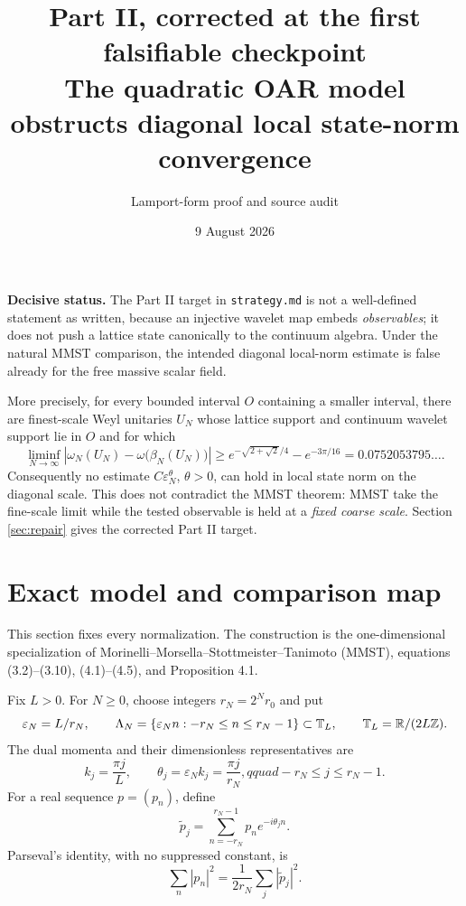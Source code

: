 \documentclass[11pt,a4paper]{article}
\title{Part II, corrected at the first falsifiable checkpoint\\[3pt]
\large The quadratic OAR model obstructs diagonal local state-norm convergence}
\author{Lamport-form proof and source audit}
\date{9 August 2026}
\newcommand{\T}{\mathbb T}
\newcommand{\eps}{\varepsilon}
\begin{document}
\maketitle

\begin{resultbox}
\textbf{Decisive status.}  The Part II target in \texttt{strategy.md} is not a
well-defined statement as written, because an injective wavelet map embeds
\emph{observables}; it does not push a lattice state canonically to the continuum
algebra.  Under the natural MMST comparison, the intended diagonal local-norm
estimate is false already for the free massive scalar field.

More precisely, for every bounded interval $O$ containing a smaller interval, there
are finest-scale Weyl unitaries $U_N$ whose lattice support and continuum wavelet
support lie in $O$ and for which
\[
 \liminf_{N\to\infty}
 \left|\omega_N(U_N)-\omega\bigl(\beta_N(U_N)\bigr)\right|
 \geq e^{-\sqrt{2+\sqrt2}/4}-e^{-3\pi/16}
 =0.0752053795\ldots .                                           \tag{R}
\]
Consequently no estimate $C\eps_N^\theta$, $\theta>0$, can hold in local state
norm on the diagonal scale.  This does not contradict the MMST theorem: MMST take
the fine-scale limit while the tested observable is held at a \emph{fixed coarse
scale}.  Section \ref{sec:repair} gives the corrected Part II target.
\end{resultbox}

\tableofcontents

\section{Exact model and comparison map}\label{sec:model}

This section fixes every normalization.  The construction is the one-dimensional
specialization of Morinelli--Morsella--Stottmeister--Tanimoto (MMST), equations
(3.2)--(3.10), (4.1)--(4.5), and Proposition 4.1.

Fix $L>0$.  For $N\geq0$, choose integers $r_N=2^Nr_0$ and put
\[
 \eps_N=L/r_N,\qquad
 \Lambda_N=\{\eps_N n:-r_N\leq n\leq r_N-1\}\subset\T_L,
 \qquad \T_L=\R/(2L\mathbb Z).
\]
The dual momenta and their dimensionless representatives are
\[
 k_j=\frac{\pi j}{L},\qquad
 \theta_j=\eps_Nk_j=\frac{\pi j}{r_N},qquad
 -r_N\leq j\leq r_N-1.                                         \tag{1.1}
\]
For a real sequence $p=(p_n)$, define
\[
 \widetilde p_j=\sum_{n=-r_N}^{r_N-1}p_ne^{-i\theta_jn}.
\]
Parseval's identity, with no suppressed constant, is
\[
 \sum_n|p_n|^2=\frac1{2r_N}\sum_j|\widetilde p_j|^2.             \tag{1.2}
\]
\end{document}
